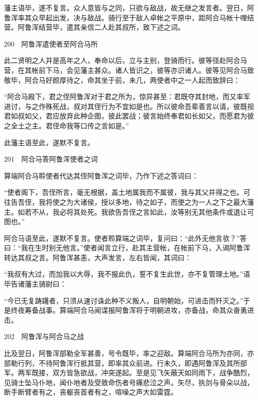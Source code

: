 \documentclass[12pt,UTF8]{ctexbook}
\begin{document}
藩主语毕，遂不复言。众人意皆与之同，只欲与敌战，故无继之发言者。翌日，阿鲁浑率其众早起出发，决与敌战。骑行至于敌人卓帐之平原中，距阿合马帐十哩结营。阿鲁浑结营毕，遣其亲信二人赴其叔所，致下述之词。





200　阿鲁浑遣使者至阿合马所

此二贤明之人并是高年之人，奉命以后，立与主别，登骑而行。彼等径赴阿合马营，在其帐前下马，会见藩主甚众。诸人皆识之，彼等亦识诸人。彼等见阿合马致敬毕，阿合马好颜厚待之，命其坐于前，未几，两使者中之一人起而致辞曰：

“阿合马殿下，君之侄阿鲁浑对于君之所为，惊异甚至：君既夺其封地，而又率军进讨，与之作殊死战，叔对其侄行为不宜如是也。所以彼命吾辈善言以请，彼既视君如叔如父，君应放弃此种企图，彼此罢战；彼言始终奉君如长如父，而愿君为彼之全土之主。君侄命我等口传之言如是。”

此藩主语至此，遂默不复言。





201　阿合马答阿鲁浑使者之词

算端阿合马聆使者代达其侄阿鲁浑之词毕，乃作下述之答词曰：

“使者阁下，吾侄所言，毫无根据，盖土地属我而不属彼，我与其父并得之也。可往告吾侄，我将使之为大诸侯，授以多地，待之如子，而使之为一人之下之最大藩主。如若不从，我必将其处死。我欲告吾侄之言如此，汝等别无其他条件或退让可图也。”

阿合马语至此，遂默不复言。使者聆算端之词毕，复问曰：“此外无他言欤？”答曰：“我在生时别无他言。”使者闻言立行，赴其主营帐，在帐前下马，入谒阿鲁浑转达其叔之言。阿鲁浑甚恚，大声发言，左右皆闻，其词曰：

“我叔有大过，而加我以大辱，我不报此仇，誓不复生此世，亦不复管理土地。”语毕告诸藩主骑尉曰：

“今已无复踌躇者，只须从速讨诛此种不义叛人，自明朝始，可进击而歼灭之。”于是终夜筹备战事。算端阿合马闻谍报阿鲁浑将于明朝进攻，亦备战，命其众奋勇进击。





202　阿鲁浑与阿合马之战

比及翌日，阿鲁浑部勒全军甚善，号令既毕，率之迎敌。算端阿合马所为亦同，亦部勒行列，不待阿鲁浑行抵其营，即率其众前进。行未久，即遇阿鲁浑及其所部军。两军既接，双方皆急欲战，冲突遂起。至是见飞矢蔽天如同雨下，战争酷烈，见骑士坠马仆地，闻仆地者及受致命伤者号痛悲泣之声。矢尽，执剑与骨朵以战，断手断臂者有之，丧躯丧首者有之，喧噪之声大如雷霆。
\end{document}
